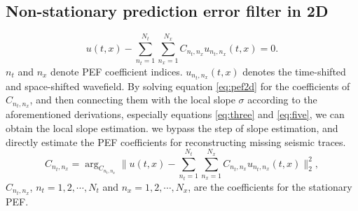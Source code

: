 \subsection{Non-stationary prediction error filter in 2D}
\begin{equation}
\label{eq:pef2d}
u(t,x) - \sum_{n_t=1}^{N_t}\sum_{n_x=1}^{N_x} C_{n_t,n_x}u_{n_t,n_x}(t,x) = 0 .
\end{equation}
$n_t$ and $n_x$ denote PEF coefficient indices. $u_{n_t,n_x}(t,x)$ denotes the time-shifted and space-shifted wavefield.  By solving equation \ref{eq:pef2d} for the coefficients of $C_{n_t,n_x}$, and then connecting them with the local slope $\sigma$ according to the aforementioned derivations, especially equations \ref{eq:three} and \ref{eq:five}, we can obtain the local slope estimation.  we bypass the step of slope estimation, and directly estimate the PEF coefficients for reconstructing missing seismic traces. 
\begin{equation}
\label{eq:pef2d_inv}
\hat{C}_{n_t,n_x} = \arg_{C_{n_t,n_x}} \parallel u(t,x) - \sum_{n_t=1}^{N_t}\sum_{n_x=1}^{N_x} C_{n_t,n_x}u_{n_t,n_x}(t,x) \parallel_2^2,
\end{equation}
$\hat{C}_{n_t,n_x}$, $n_t=1,2,\cdots,N_t$ and $n_x=1,2,\cdots,N_x$, are the coefficients for the stationary PEF. 

